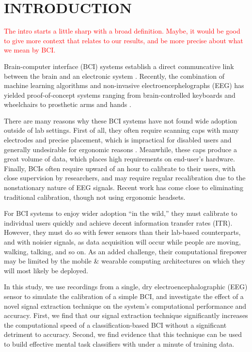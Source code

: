 \section{\uppercase{Introduction}}
\label{sec:introduction}

\textcolor{red}{The intro starts a little sharp with a broad definition. Maybe, it would be good to give more context that relates to our results, and be more precise about what we mean by BCI.}

\noindent Brain-computer interface (BCI) systems establish a direct communcative link between the brain and an electronic system \cite{dornhege_toward_2007,mcfarland_brain-computer_2011}.  Recently, the combination of machine learning algorithms and non-invasive electroencephelographs (EEG) has yielded proof-of-concept systems ranging from brain-controlled keyboards and wheelchairs to prosthetic arms and hands \cite{blankertz_note_2007,millan_combining_2010,d._mattia_brain_2011,hill_practical_2014,campbell_neurophone:_2010}. 

There are many reasons why these BCI systems have not found wide adoption outside of lab settings. First of all, they often require scanning caps with many electrodes and precise placement, which is impractical for disabled users and generally undesirable for ergonomic reasons \cite{ekandem_evaluating_2012,leeb_transferring_2013}. Meanwhile, these caps produce a great volume of data, which places high requirements on end-user's hardware. Finally, BCIs often require upward of an hour to calibrate to their users, with close supervision by researchers, and may require regular recalibration due to the nonstationary nature of EEG signals. \cite{vidaurre_fully_2006,vidaurre_co-adaptive_2011,blankertz_non-invasive_2007} Recent work has come close to eliminating traditional calibration, though not using ergonomic headsets. \cite{kindermans_true_2014}

For BCI systems to enjoy wider adoption ``in the wild,'' they must calibrate to individual users quickly and achieve decent information transfer rates (ITR). However, they must do so with fewer sensors than their lab-based counterparts, and with noisier signals, as data acquisition will occur while people are moving, walking, talking, and so on. As an added challenge, their computational firepower may be limited by the mobile \& wearable computing architectures on which they will most likely be deployed. 

In this study, we use recordings from a single, dry electroencephalographic (EEG) sensor to simulate the calibration of a simple BCI, and investigate the effect of a novel signal extraction technique on the system’s computational performance and accuracy. First, we find that our signal extraction technique significantly increases the computational speed of a classification-based BCI without a significant detriment to accuracy. Second, we find evidence that this technique can be used to build effective mental task classifiers with under a minute of training data.